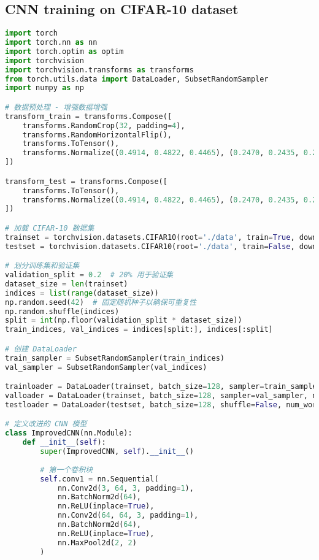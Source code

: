 \documentclass[UTF8]{report}
\theoremstyle{MyLineTheoremStyle} %
\theoremstyle{MyBlockTheoremStyle} %
\theoremstyle{MySubsubsectionStyle} %
\begin{document}
\subsection{CNN training on CIFAR-10 dataset}
\begin{lstlisting}[language=python, caption={神经网络CNN训练（纯手写）}, label={lst:cnn_train_handwritten}]
import torch
import torch.nn as nn
import torch.optim as optim
import torchvision
import torchvision.transforms as transforms
from torch.utils.data import DataLoader, SubsetRandomSampler
import numpy as np

# 数据预处理 - 增强数据增强
transform_train = transforms.Compose([
    transforms.RandomCrop(32, padding=4),
    transforms.RandomHorizontalFlip(),
    transforms.ToTensor(),
    transforms.Normalize((0.4914, 0.4822, 0.4465), (0.2470, 0.2435, 0.2616))
])

transform_test = transforms.Compose([
    transforms.ToTensor(),
    transforms.Normalize((0.4914, 0.4822, 0.4465), (0.2470, 0.2435, 0.2616))
])

# 加载 CIFAR-10 数据集
trainset = torchvision.datasets.CIFAR10(root='./data', train=True, download=True, transform=transform_train)
testset = torchvision.datasets.CIFAR10(root='./data', train=False, download=True, transform=transform_test)

# 划分训练集和验证集
validation_split = 0.2  # 20% 用于验证集
dataset_size = len(trainset)
indices = list(range(dataset_size))
np.random.seed(42)  # 固定随机种子以确保可重复性
np.random.shuffle(indices)
split = int(np.floor(validation_split * dataset_size))
train_indices, val_indices = indices[split:], indices[:split]

# 创建 DataLoader
train_sampler = SubsetRandomSampler(train_indices)
val_sampler = SubsetRandomSampler(val_indices)

trainloader = DataLoader(trainset, batch_size=128, sampler=train_sampler, num_workers=2)
valloader = DataLoader(trainset, batch_size=128, sampler=val_sampler, num_workers=2)
testloader = DataLoader(testset, batch_size=128, shuffle=False, num_workers=2)

# 定义改进的 CNN 模型
class ImprovedCNN(nn.Module):
    def __init__(self):
        super(ImprovedCNN, self).__init__()
        
        # 第一个卷积块
        self.conv1 = nn.Sequential(
            nn.Conv2d(3, 64, 3, padding=1),
            nn.BatchNorm2d(64),
            nn.ReLU(inplace=True),
            nn.Conv2d(64, 64, 3, padding=1),
            nn.BatchNorm2d(64),
            nn.ReLU(inplace=True),
            nn.MaxPool2d(2, 2)
        )
        

\end{lstlisting}
\end{document}
